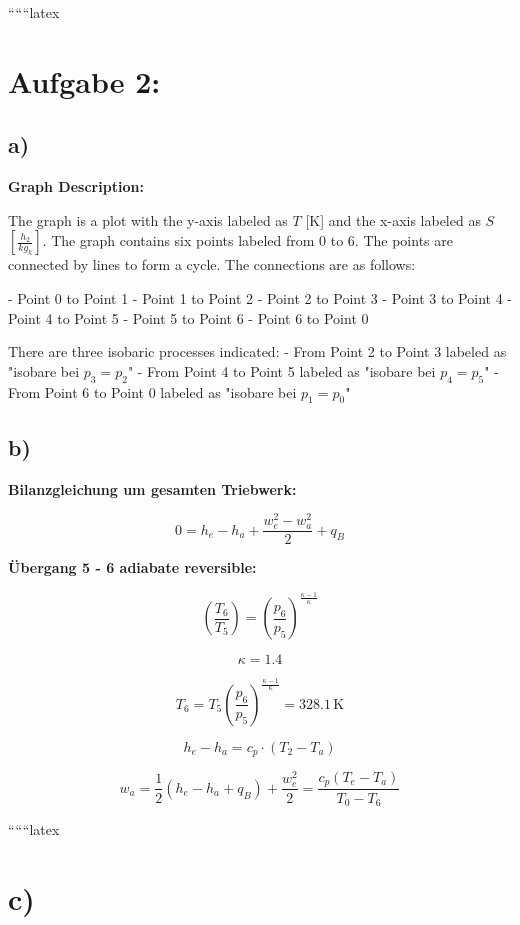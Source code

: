 
``````latex


\section*{Aufgabe 2:}

\subsection*{a)}

\begin{center}
\textbf{Graph Description:}

The graph is a plot with the y-axis labeled as \( T \) [K] and the x-axis labeled as \( S \) \(\left[ \frac{h_2}{kg_k} \right]\). The graph contains six points labeled from 0 to 6. The points are connected by lines to form a cycle. The connections are as follows:

- Point 0 to Point 1
- Point 1 to Point 2
- Point 2 to Point 3
- Point 3 to Point 4
- Point 4 to Point 5
- Point 5 to Point 6
- Point 6 to Point 0

There are three isobaric processes indicated:
- From Point 2 to Point 3 labeled as "isobare bei \( p_3 = p_2 \)"
- From Point 4 to Point 5 labeled as "isobare bei \( p_4 = p_5 \)"
- From Point 6 to Point 0 labeled as "isobare bei \( p_1 = p_0 \)"
\end{center}

\subsection*{b)}

\textbf{Bilanzgleichung um gesamten Triebwerk:}

\[
0 = h_e - h_a + \frac{w_e^2 - w_a^2}{2} + q_B
\]

\textbf{Übergang 5 - 6 adiabate reversible:}

\[
\left( \frac{T_6}{T_5} \right) = \left( \frac{p_6}{p_5} \right)^{\frac{\kappa - 1}{\kappa}}
\]

\[
\kappa = 1.4
\]

\[
T_6 = T_5 \left( \frac{p_6}{p_5} \right)^{\frac{\kappa - 1}{\kappa}} = 328.1 \, \text{K}
\]

\[
h_e - h_a = c_p \cdot (T_2 - T_a)
\]

\[
w_a = \frac{1}{2} (h_e - h_a + q_B) + \frac{w_e^2}{2} = \frac{c_p (T_e - T_a)}{T_0 - T_6}
\]

``````latex


\section*{c)}

